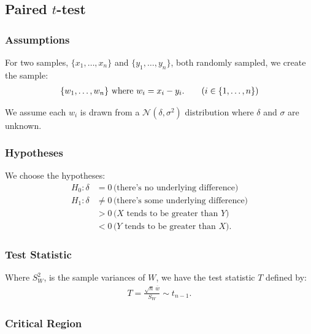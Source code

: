 \documentclass[a4paper, 12pt, twoside]{article}
\begin{document}
\newpage

\subsection{Paired $t$-test}

\subsubsection{Assumptions}

For two samples, $\{x_1, \ldots, x_n\}$ and $\{y_1, \ldots, y_n\}$, both
randomly sampled, we create the sample:
\begin{align*}
    \{w_1, \ldots, w_n\} \text{ where } w_i = x_i - y_i. \tag{$i \in \{1, \ldots, n\}$}
\end{align*}

We assume each $w_i$ is drawn from a $\mathcal{N}(\delta, \sigma^2)$
distribution where $\delta$ and $\sigma$ are unknown.

\subsubsection{Hypotheses}

We choose the hypotheses:
\begin{align*}
    H_0 : \delta & = 0 \, \text{(there's no underlying difference)}      \\
    H_1 : \delta & \neq 0 \, \text{(there's some underlying difference)} \\
                 & > 0 \, \text{($X$ tends to be greater than $Y$)}      \\
                 & < 0 \, \text{($Y$ tends to be greater than $X$)}.
\end{align*}

\subsubsection{Test Statistic}

Where $S_W^2$, is the sample variances of $W$, we have the
test statistic $T$ defined by:
\begin{align*}
    T = \frac{\sqrt{n} \, \overline{w}}{S_W} \sim t_{n - 1}.
\end{align*}

\subsubsection{Critical Region}
\end{document}
